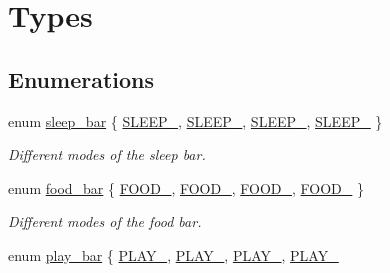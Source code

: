 \hypertarget{group__types}{}\section{Types}
\label{group__types}
\subsection*{Enumerations}
\begin{DoxyCompactItemize}
\item 
enum \hyperlink{group__types_ga210774229705ea136db591a108c52d39}{sleep\+\_\+bar} \{ \hyperlink{group__types_gga210774229705ea136db591a108c52d39a34b8ae25d2c59204b94c7f59f8807ddc}{S\+L\+E\+E\+P\+\_}, 
\hyperlink{group__types_gga210774229705ea136db591a108c52d39a373243d2c5eab6e7ccd90cd7b00ac6a0}{S\+L\+E\+E\+P\+\_}, 
\hyperlink{group__types_gga210774229705ea136db591a108c52d39adb15ec35d217dd149a609869ad8965b0}{S\+L\+E\+E\+P\+\_}, 
\hyperlink{group__types_gga210774229705ea136db591a108c52d39a99607e587be600c9c78736442f98e0c2}{S\+L\+E\+E\+P\+\_}
 \}\begin{DoxyCompactList}\small\item\em Different modes of the sleep bar. \end{DoxyCompactList}
\item 
enum \hyperlink{group__types_ga68b33015e0d4635ee8ddb795eca9d963}{food\+\_\+bar} \{ \hyperlink{group__types_gga68b33015e0d4635ee8ddb795eca9d963ae6087a2b6ba833555ae35b9de54b8e45}{F\+O\+O\+D\+\_}, 
\hyperlink{group__types_gga68b33015e0d4635ee8ddb795eca9d963ac101e2bc1eec1f422377d7666426db82}{F\+O\+O\+D\+\_}, 
\hyperlink{group__types_gga68b33015e0d4635ee8ddb795eca9d963a201d01c246ac3967468218ee0e0eed60}{F\+O\+O\+D\+\_}, 
\hyperlink{group__types_gga68b33015e0d4635ee8ddb795eca9d963aa058aeefefb2b143937d5cc840b357f2}{F\+O\+O\+D\+\_}
 \}\begin{DoxyCompactList}\small\item\em Different modes of the food bar. \end{DoxyCompactList}
\item 
enum \hyperlink{group__types_gaac3396b3def300539a13396b352b7fca}{play\+\_\+bar} \{ \hyperlink{group__types_ggaac3396b3def300539a13396b352b7fcaaa4dc96448892c4533363f7f439d56c7c}{P\+L\+A\+Y\+\_}, 
\hyperlink{group__types_ggaac3396b3def300539a13396b352b7fcaad398f358fe0160f104878a392f770d73}{P\+L\+A\+Y\+\_}, 
\hyperlink{group__types_ggaac3396b3def300539a13396b352b7fcaa4a6603bd358878efd0d21a7968674d42}{P\+L\+A\+Y\+\_}, 
\hyperlink{group__types_ggaac3396b3def300539a13396b352b7fcaa8da632afe00bac8c0fcc2d5a3d648e81}{P\+L\+A\+Y\+\_}

\end{DoxyCompactItemize}
